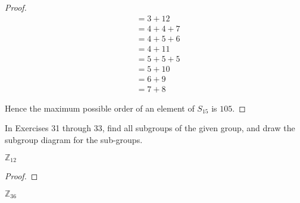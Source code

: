 \begin{proof}
\begin{align*}
           & = 3 + 12                                                              \\
           & = 4 + 4 + 7                                                           \\
           & = 4 + 5 + 6                                                           \\
           & = 4 + 11                                                              \\
           & = 5 + 5 + 5                                                           \\
           & = 5 + 10                                                              \\
           & = 6 + 9                                                               \\
           & = 7 + 8
    \end{align*}
    \endgroup

    Hence the maximum possible order of an element of $S_{15}$ is $105$.
\end{proof}

In Exercises 31 through 33, find all subgroups of the given group, and draw the subgroup diagram for the sub-groups.

\begin{exercise}
    $\mathbb{Z}_{12}$
\end{exercise}

\begin{proof}
\end{proof}

\begin{exercise}
    $\mathbb{Z}_{36}$
\end{exercise}

